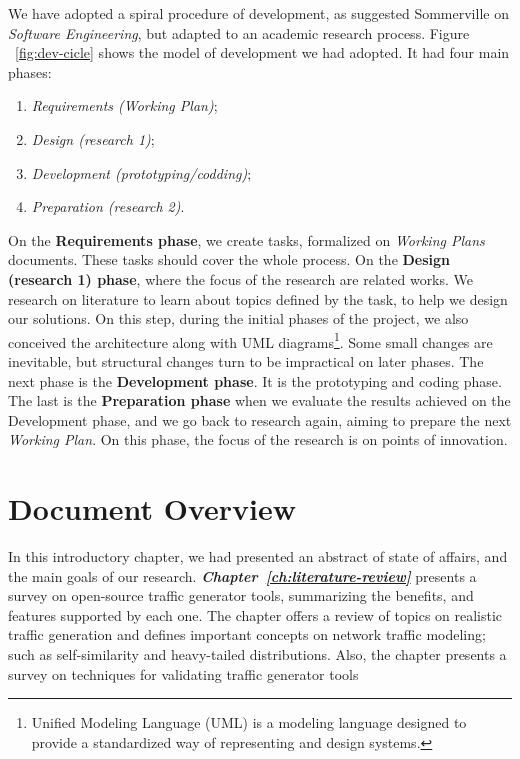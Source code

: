 We have adopted a spiral procedure of development, as suggested Sommerville on \textit{Software Engineering}\cite{sommerville}, but adapted to an academic research process. Figure ~\ref{fig:dev-cicle} shows the model of development we had adopted. It had four main phases: 

\begin{enumerate}
    \item \textit{Requirements (Working Plan)};
    \item \textit{Design (research 1)};
    \item \textit{Development (prototyping/codding)};
    \item \textit{Preparation (research 2)}.
\end{enumerate}

On the \textbf{Requirements phase}, we create tasks,  formalized on \textit{Working Plans} documents.  These tasks should cover the whole process. On the \textbf{Design (research 1) phase}, where the focus of the research are related works. We research on literature to learn about topics defined by the task, to help we design our solutions. On this step, during the initial phases of the project,  we also conceived the architecture along with \acrshort{UML} diagrams\footnote{Unified Modeling Language (UML) is a modeling language designed to provide a standardized way of representing and design systems\cite{uml}.}. Some small changes are inevitable, but structural changes turn to be impractical on later phases. The next phase is the \textbf{Development phase}. It is the prototyping and coding phase.  The last is the \textbf{Preparation phase} when we evaluate the results achieved on the Development phase, and we go back to research again,  aiming to prepare the next \textit{Working Plan}.  On this phase, the focus of the research is on points of innovation.


\section{Document Overview}


In this introductory chapter, we had presented an abstract of state of affairs, and the main goals of our research. \textit{\textbf{Chapter~\ref{ch:literature-review}}} presents a survey on open-source traffic generator tools, summarizing the benefits, and features supported by each one. The chapter offers a  review of topics on realistic traffic generation and defines important concepts on network traffic modeling; such as self-similarity and heavy-tailed distributions. Also, the chapter presents a survey on techniques for validating traffic generator tools 

